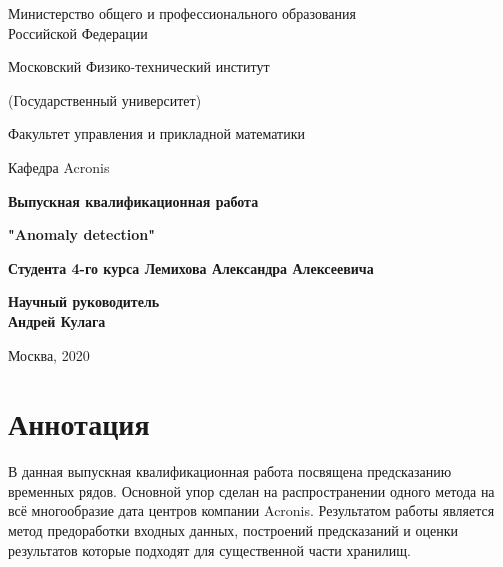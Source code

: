 \documentclass[14pt, a4paper]{extarticle}
\begin{document}
	
	\vskip 3mm
	
	\setcounter{page}{1}
	\begin{center}
		\thispagestyle{empty}
		
		{ Министерство общего и профессионального образования \\}
		{ Российской Федерации \\}
		
		
		{ Московский Физико-технический институт \\}
		
		{(Государственный университет) \\}
		
		{ Факультет управления и прикладной математики \\}
		
		{ Кафедра Acronis \\[4cm]}
		
		{ \bf \Large Выпускная квалификационная работа\\}
		
		{ \bf \Large{"Anomaly detection"\\[1cm]} }
		
		{\bf {Студента 4-го курса Лемихова Александра Алексеевича}\\[3cm]}
		
	\end{center}
	
	\begin{flushright}
		\bf{Научный руководитель}\\
		\bf{Андрей Кулага}\\[4cm]
	\end{flushright}
	
	\begin{center}
		Москва, 2020
	\end{center}
	
	\newpage
	\tableofcontents
	\newpage
	
	
	\section{Аннотация}
	В данная выпускная квалификационная работа посвящена предсказанию временных рядов. 
	Основной упор сделан на распространении одного метода на всё многообразие дата центров компании Acronis. 
	Результатом работы является метод предоработки входных данных, построений предсказаний и оценки результатов которые подходят для существенной части хранилищ.
	
\end{document}
